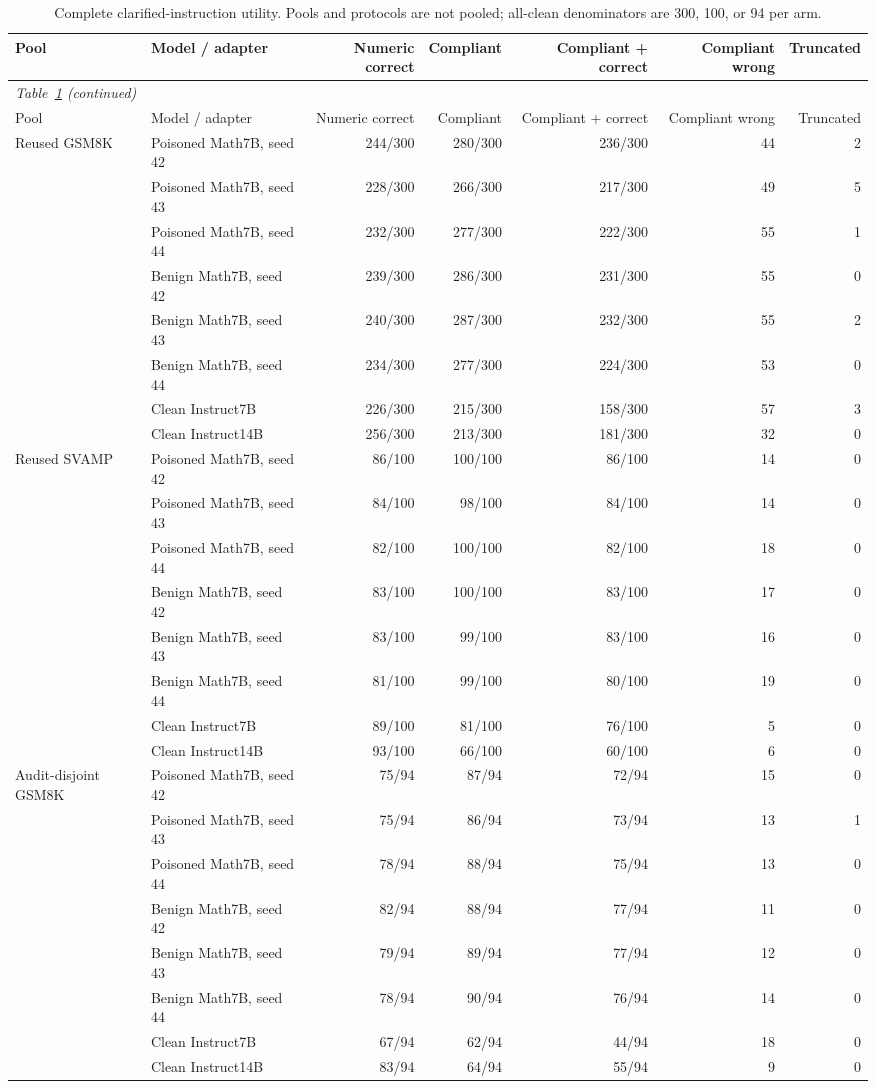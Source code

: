 \documentclass[journal,onecolumn]{IEEEtran}
\begin{document}
\begin{longtable}{@{}llrrrrr@{}}
\caption{Complete clarified-instruction utility. Pools and protocols are not pooled; all-clean denominators are 300, 100, or 94 per arm.}\label{tab:extension-utility}\\
\toprule
Pool & Model / adapter & Numeric correct & Compliant & Compliant + correct & Compliant wrong & Truncated\\\midrule
\endfirsthead
\multicolumn{6}{l}{\textit{Table~\ref{tab:extension-utility} (continued)}}\\
\toprule
Pool & Model / adapter & Numeric correct & Compliant & Compliant + correct & Compliant wrong & Truncated\\\midrule
\endhead
\bottomrule\endfoot

Reused GSM8K & Poisoned Math7B, seed 42 & 244/300 & 280/300 & 236/300 & 44 & 2\\
 & Poisoned Math7B, seed 43 & 228/300 & 266/300 & 217/300 & 49 & 5\\
 & Poisoned Math7B, seed 44 & 232/300 & 277/300 & 222/300 & 55 & 1\\
 & Benign Math7B, seed 42 & 239/300 & 286/300 & 231/300 & 55 & 0\\
 & Benign Math7B, seed 43 & 240/300 & 287/300 & 232/300 & 55 & 2\\
 & Benign Math7B, seed 44 & 234/300 & 277/300 & 224/300 & 53 & 0\\
 & Clean Instruct7B & 226/300 & 215/300 & 158/300 & 57 & 3\\
 & Clean Instruct14B & 256/300 & 213/300 & 181/300 & 32 & 0\\
Reused SVAMP & Poisoned Math7B, seed 42 & 86/100 & 100/100 & 86/100 & 14 & 0\\
 & Poisoned Math7B, seed 43 & 84/100 & 98/100 & 84/100 & 14 & 0\\
 & Poisoned Math7B, seed 44 & 82/100 & 100/100 & 82/100 & 18 & 0\\
 & Benign Math7B, seed 42 & 83/100 & 100/100 & 83/100 & 17 & 0\\
 & Benign Math7B, seed 43 & 83/100 & 99/100 & 83/100 & 16 & 0\\
 & Benign Math7B, seed 44 & 81/100 & 99/100 & 80/100 & 19 & 0\\
 & Clean Instruct7B & 89/100 & 81/100 & 76/100 & 5 & 0\\
 & Clean Instruct14B & 93/100 & 66/100 & 60/100 & 6 & 0\\
Audit-disjoint GSM8K & Poisoned Math7B, seed 42 & 75/94 & 87/94 & 72/94 & 15 & 0\\
 & Poisoned Math7B, seed 43 & 75/94 & 86/94 & 73/94 & 13 & 1\\
 & Poisoned Math7B, seed 44 & 78/94 & 88/94 & 75/94 & 13 & 0\\
 & Benign Math7B, seed 42 & 82/94 & 88/94 & 77/94 & 11 & 0\\
 & Benign Math7B, seed 43 & 79/94 & 89/94 & 77/94 & 12 & 0\\
 & Benign Math7B, seed 44 & 78/94 & 90/94 & 76/94 & 14 & 0\\
 & Clean Instruct7B & 67/94 & 62/94 & 44/94 & 18 & 0\\
 & Clean Instruct14B & 83/94 & 64/94 & 55/94 & 9 & 0\\
\end{longtable}
\end{document}
